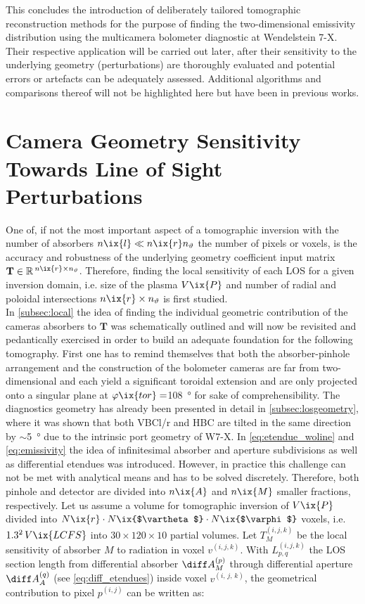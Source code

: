 %
        This concludes the introduction of deliberately tailored tomographic reconstruction methods for the purpose of finding the two-dimensional emissivity distribution using the multicamera bolometer diagnostic at Wendelstein 7-X. Their respective application will be carried out later, after their sensitivity to the underlying geometry (perturbations) are thoroughly evaluated and potential errors or artefacts can be adequately assessed. Additional algorithms and comparisons thereof will not be highlighted here but have been in previous works\cite{Anton1996,Giannone1997,Li2021}.%
%
    \section{Camera Geometry Sensitivity Towards Line of Sight Perturbations}\label{sec:geomimpact}%
%
        One of, if not the most important aspect of a tomographic inversion with the number of absorbers $n\ix{l}\ll n\ix{r}n_{\text{$\vartheta$}}$ the number of pixels or voxels, is the accuracy and robustness of the underlying geometry coefficient input matrix $\mathbf{T}\in\mathbb{R}\,^{n\ix{r}\times n_{\text{$\vartheta$}}}$. Therefore, finding the local sensitivity of each LOS for a given inversion domain, i.e. size of the plasma $V\ix{P}$ and number of radial and poloidal intersections $n\ix{r}\times n_{\text{$\vartheta$}}$ is first studied.\\%
        In \cref{subsec:local} the idea of finding the individual geometric contribution of the cameras absorbers to $\mathbf{T}$ was schematically outlined and will now be revisited and pedantically exercised in order to build an adequate foundation for the following tomography. First one has to remind themselves that both the absorber-pinhole arrangement and the construction of the bolometer cameras are far from two-dimensional and each yield a significant toroidal extension and are only projected onto a singular plane at $\varphi\ix{tor}=$\SI{108}{\degree} for sake of comprehensibility. The diagnostics geometry has already been presented in detail in \cref{subsec:losgeometry}, where it was shown that both VBCl/r and HBC are tilted in the same direction by $\sim$\SI{5}{\degree} due to the intrinsic port geometry of W7-X. In \cref{eq:etendue_woline} and \cref{eq:emissivity} the idea of infinitesimal absorber and aperture subdivisions as well as differential etendues was introduced. However, in practice this challenge can not be met with analytical means and has to be solved discretely. Therefore, both pinhole and detector are divided into $n\ix{A}$ and $n\ix{M}$ smaller fractions, respectively. Let us assume a volume for tomographic inversion of $V\ix{P}$ divided into $N\ix{r}\cdot N\ix{$\vartheta$}\cdot N\ix{$\varphi$}$ voxels, i.e. $1.3^{2}\,V\ix{LCFS}$ into $30\times120\times10$ partial volumes. Let $T^{\left(i,j,k\right)}_{M}$ be the local sensitivity of absorber $M$ to radiation in voxel $v^{\left(i,j,k\right)}$. With $L^{\left(i,j,k\right)}_{p,q}$ the LOS section length from differential absorber $\diff A_{M}^{\left(p\right)}$ through differential aperture $\diff A_{A}^{\left(q\right)}$ (see \cref{eq:diff_etendues}) inside voxel $v^{\left(i,\,j,\,k\right)}$, the geometrical contribution to pixel $p^{\left(i,j\right)}$ can be written as:
